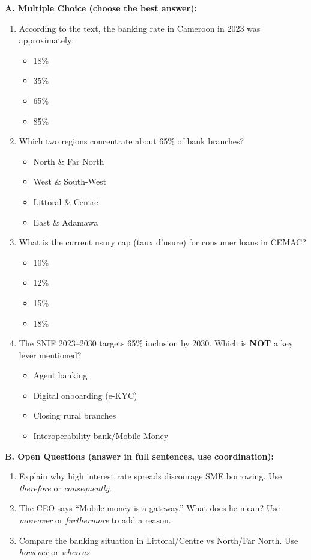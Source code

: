 \documentclass[11pt]{article}
\begin{document}
\begin{exercice}
\textbf{A. Multiple Choice (choose the best answer):}
\begin{enumerate}
\item According to the text, the banking rate in Cameroon in 2023 was approximately:
  \begin{itemize}
  \item[a)] 18\% \item[b)] 35\% \item[c)] 65\% \item[d)] 85\%
  \end{itemize}
\item Which two regions concentrate about 65\% of bank branches?
  \begin{itemize}
  \item[a)] North \& Far North \item[b)] West \& South-West \item[c)] Littoral \& Centre \item[d)] East \& Adamawa
  \end{itemize}
\item What is the current usury cap (taux d'usure) for consumer loans in CEMAC?
  \begin{itemize}
  \item[a)] 10\% \item[b)] 12\% \item[c)] 15\% \item[d)] 18\%
  \end{itemize}
\item The SNIF 2023--2030 targets 65\% inclusion by 2030. Which is \textbf{NOT} a key lever mentioned?
  \begin{itemize}
  \item[a)] Agent banking \item[b)] Digital onboarding (e-KYC) \item[c)] Closing rural branches \item[d)] Interoperability bank/Mobile Money
  \end{itemize}
\end{enumerate}

\textbf{B. Open Questions (answer in full sentences, use coordination):}
\begin{enumerate}
\item Explain why high interest rate spreads discourage SME borrowing. Use \emph{therefore} or \emph{consequently}.
\item The CEO says ``Mobile money is a gateway.'' What does he mean? Use \emph{moreover} or \emph{furthermore} to add a reason.
\item Compare the banking situation in Littoral/Centre vs North/Far North. Use \emph{however} or \emph{whereas}.
\end{enumerate}
\end{exercice}
\end{document}
